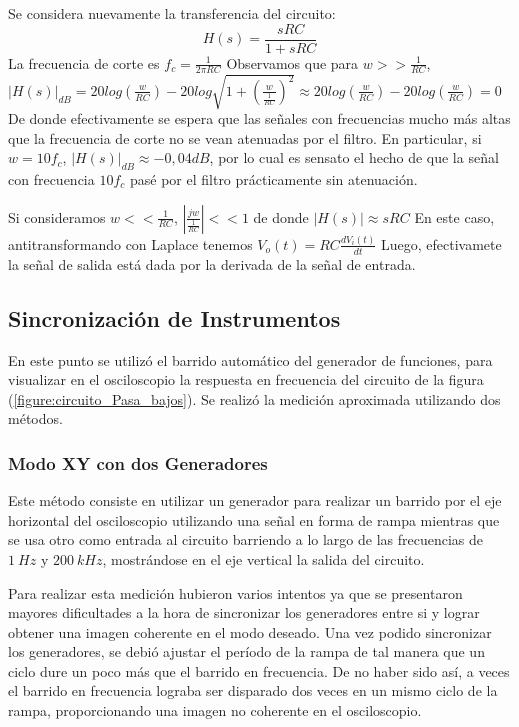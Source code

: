 \documentclass[11pt, a4paper]{article}
\begin{document}
Se considera nuevamente la transferencia del circuito:
\begin{equation*}
    H(s)=\frac{sRC}{1+sRC}
\end{equation*}
La frecuencia de corte es $f_c=\frac{1}{2\pi RC}$ 
Observamos que para $w>>\frac{1}{RC}$, $|H(s)|_{dB}=20log(\frac{w}{RC})-20log\sqrt{1+(\frac{w}{\frac{1}{RC}})^2}\approx20log(\frac{w}{RC})-20log(\frac{w}{RC})=0$ De donde efectivamente se espera que las señales con frecuencias mucho más altas que la frecuencia de corte no se vean atenuadas por el filtro. En particular, si $w=10f_c$, $|H(s)|_{dB}\approx-0,04dB$, por lo cual es sensato el hecho de que la señal con frecuencia $10f_c$ pasé por el filtro prácticamente sin atenuación.

Si consideramos $w<<\frac{1}{RC}$, $|\frac{jw}{\frac{1}{RC}}|<<1$ de donde $|H(s)|\approx sRC$ En este caso, antitransformando con Laplace tenemos $V_o(t)=RC\frac{dV_i(t)}{dt}$ Luego, efectivamete la señal de salida está dada por la derivada de la señal de entrada.


\break
\subsection*{Sincronización de Instrumentos}
En este punto se utilizó el barrido automático del generador de funciones, para visualizar en el osciloscopio la respuesta en frecuencia del circuito de la figura (\ref{figure:circuito_Pasa_bajos}). Se realizó la medición aproximada utilizando dos métodos.

\subsubsection*{Modo XY con dos Generadores}
Este método consiste en utilizar un generador para realizar un barrido por el eje horizontal del osciloscopio utilizando una señal en forma de rampa mientras que se usa otro como entrada al circuito barriendo a lo largo de las frecuencias de $1 \ Hz$ y $200 \ kHz$, mostrándose en el eje vertical la salida del circuito.

Para realizar esta medición hubieron varios intentos ya que se presentaron mayores dificultades a la hora de sincronizar los generadores entre si y lograr obtener una imagen coherente en el modo deseado. Una vez podido sincronizar los generadores, se debió ajustar el período de la rampa de tal manera que un ciclo dure un poco más que el barrido en frecuencia. De no haber sido así, a veces el barrido en frecuencia lograba ser disparado dos veces en un mismo ciclo de la rampa, proporcionando una imagen no coherente en el osciloscopio.
\end{document}
